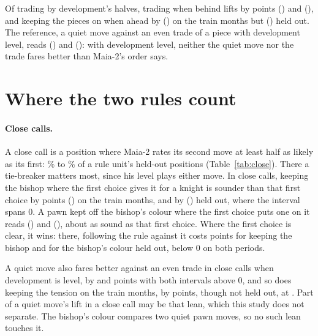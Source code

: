 \documentclass[11pt]{article}
\begin{document}
Of trading by development's halves, trading when behind lifts by \BehindTrain{} points
(\BehindTrainCi) and \BehindHeld{} (\BehindHeldCi), and keeping the pieces on when ahead by
\AheadTrain{} (\AheadTrainCi) on the train months but \AheadHeld{} (\AheadHeldCi) held out. The
reference, a quiet move against an even trade of a piece with development level, reads
\LevelTrain{} (\LevelTrainCi) and \LevelHeld{} (\LevelHeldCi): with development level, neither the
quiet move nor the trade fares better than Maia-2's order says.

\UnitTable

\section{Where the two rules count}

\paragraph{Close calls.} A close call is a position where Maia-2 rates its second move at least half
as likely as its first: \CloseShareLow\% to \CloseShareHigh\% of a rule unit's held-out positions
(Table~\ref{tab:close}). There a tie-breaker matters most, since his level plays either move. In close calls, keeping the bishop where the first choice gives it for a knight
is sounder than that first choice by \BfnCloseBfTrain{} points (\BfnCloseBfTrainCi) on the train
months, and by \BfnCloseBfHeld{} (\BfnCloseBfHeldCi) held out, where the interval spans 0. A pawn
kept off the bishop's colour where the first choice puts one on it reads \ColCloseBfTrain{}
(\ColCloseBfTrainCi) and \ColCloseBfHeld{} (\ColCloseBfHeldCi), about as sound as that first
choice. Where the first choice is clear, it wins: there, following the rule against it costs
\BfnClearBfHeld{} points for keeping the bishop and \ColClearBfHeld{} for the bishop's colour held
out, below 0 on both periods.

A quiet move also fares better against an even trade in close calls when development is level, by
\LevelCloseTrain{} and \LevelCloseHeld{} points with both intervals above 0, and so does keeping the
tension on the train months, by \TenCloseTrain{} points, though not held out, at \TenCloseHeld. Part
of a quiet move's lift in a close call may be that lean, which this study does not separate. The
bishop's colour compares two quiet pawn moves, so no such lean touches it.

\CloseTable
\end{document}
